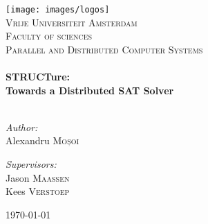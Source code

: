 

\begin{titlepage}

\begin{center}
\texttt{[image: images/logos]}\\[1cm]

\textsc{\LARGE Vrije Universiteit Amsterdam}\\
\textsc{\Large Faculty of sciences \\
Parallel and Distributed Computer Systems}\\[1.5cm]

\HRule \\[0.4cm]
{ \bfseries \huge STRUCTure: \\
\LARGE Towards a Distributed SAT Solver}\\[0.4cm]
\HRule \\[1.5cm]

\begin{minipage}{0.4\textwidth}
  \begin{flushleft} \large
    \emph{Author:} \\
    Alexandru \textsc{Moșoi}
  \end{flushleft}
\end{minipage}
\begin{minipage}{0.4\textwidth}
  \begin{flushright} \large
    \emph{Supervisors:} \\
    Jason \textsc{Maassen} \\
    Kees \textsc{Verstoep}
  \end{flushright}
\end{minipage}

\vfill

{\large \today}

\end{center}
\end{titlepage}
